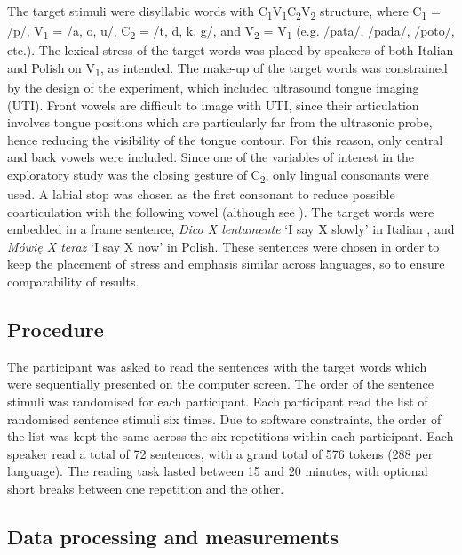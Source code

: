 \documentclass[]{JASAnew}
\begin{document}
The target stimuli were disyllabic words with
C\textsubscript{1}V\textsubscript{1}C\textsubscript{2}V\textsubscript{2}
structure, where C\textsubscript{1} = /p/, V\textsubscript{1} = /a, o,
u/, C\textsubscript{2} = /t, d, k, g/, and V\textsubscript{2} =
V\textsubscript{1} (e.g. /pata/, /pada/, /poto/, etc.). The lexical
stress of the target words was placed by speakers of both Italian and
Polish on V\textsubscript{1}, as intended. The make-up of the target
words was constrained by the design of the experiment, which included
ultrasound tongue imaging (UTI). Front vowels are difficult to image
with UTI, since their articulation involves tongue positions which are
particularly far from the ultrasonic probe, hence reducing the
visibility of the tongue contour. For this reason, only central and back
vowels were included. Since one of the variables of interest in the
exploratory study was the closing gesture of C\textsubscript{2}, only
lingual consonants were used. A labial stop was chosen as the first
consonant to reduce possible coarticulation with the following vowel
(although see \citealt{vazquez-alvarez2007}). The target words were
embedded in a frame sentence, \emph{Dico X lentamente} `I say X slowly'
in Italian \citep[following][]{hajek2008}, and \emph{Mówię X teraz} `I
say X now' in Polish. These sentences were chosen in order to keep the
placement of stress and emphasis similar across languages, so to ensure
comparability of results.

\hypertarget{procedure}{%
\subsection{Procedure}\label{procedure}}

The participant was asked to read the sentences with the target words
which were sequentially presented on the computer screen. The order of
the sentence stimuli was randomised for each participant. Each
participant read the list of randomised sentence stimuli six times. Due
to software constraints, the order of the list was kept the same across
the six repetitions within each participant. Each speaker read a total
of 72 sentences, with a grand total of 576 tokens (288 per language).
The reading task lasted between 15 and 20 minutes, with optional short
breaks between one repetition and the other.

\hypertarget{data-processing-and-measurements}{%
\subsection{Data processing and
measurements}\label{data-processing-and-measurements}}
\end{document}
